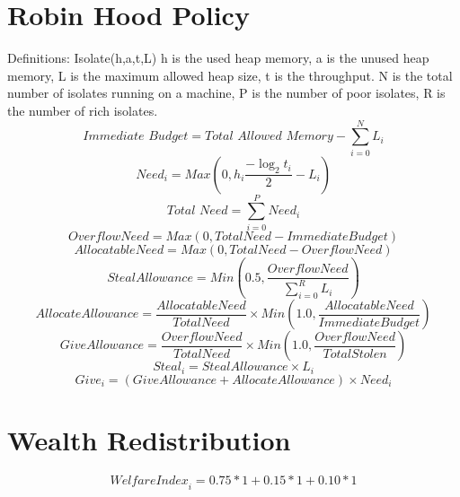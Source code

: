 \documentclass{l4proj}
\begin{document}
\section{Robin Hood Policy}
Definitions: Isolate(h,a,t,L) h is the used heap memory, a is the unused heap memory, L is the maximum allowed heap size, t is the throughput. N is the total number of isolates running on a machine, P is the number of poor isolates, R is the number of rich isolates. 
\begin{equation}
\textit{Immediate Budget} = \textit{Total Allowed Memory} - \sum_{i=0}^{N}L_i
\end{equation}
\begin{equation}
Need_i     = Max(0,h_i \frac{-\log_2{t_i}}{2} - L_i)
\end{equation}
\begin{equation}
\textit{Total Need} = \sum_{i=0}^{P}Need_i
\end{equation}
\begin{equation}
\textit{OverflowNeed}     = Max(0,\textit{TotalNeed} - \textit{ImmediateBudget}) 
\end{equation}
\begin{equation}
\textit{AllocatableNeed}     = Max(0,\textit{TotalNeed} - \textit{OverflowNeed}) 
\end{equation}
\begin{equation}
\textit{StealAllowance} = Min(0.5,\frac{\textit{OverflowNeed}}{\sum_{i=0}^{R}L_i}) 
\end{equation}
\begin{equation}
\textit{AllocateAllowance} = \frac{\textit{AllocatableNeed}}{\textit{TotalNeed}} \times Min(1.0,\frac{\textit{AllocatableNeed}}{\textit{ImmediateBudget}}) 
\end{equation}
\begin{equation}
\textit{GiveAllowance} = \frac{\textit{OverflowNeed}}{\textit{TotalNeed}} \times Min(1.0,\frac{\textit{OverflowNeed}}{\textit{TotalStolen}}) 
\end{equation}
\begin{equation}
Steal_i = \textit{StealAllowance} \times L_i 
\end{equation}
\begin{equation}
Give_i = (\textit{GiveAllowance} + \textit{AllocateAllowance}) \times Need_i 
\end{equation}

\section{Wealth Redistribution}
\begin{equation}
\textit{WelfareIndex}_i = 0.75*1+0.15*1+0.10*1
\end{equation}
\end{document}
